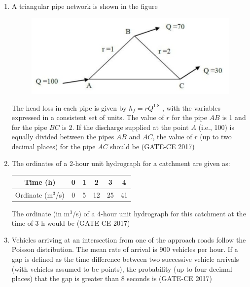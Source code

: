 \documentclass[journal,12pt,onecolumn]{article}
\theoremstyle{remark}
\begin{document}
\begin{enumerate}
    \item A triangular pipe network is shown in the figure 
    \begin{figure}[H]
    \centering
    \includegraphics[width=0.7\columnwidth]{figs/imageq23.jpg}  
    \caption{}
    \label{fig:23}
    \end{figure}
    The head loss in each pipe is given by $h_f = rQ^{1.8}$ , with the variables expressed in a consistent set of units. The value of $r$ for the pipe $AB$ is 1 and for the pipe $BC$ is 2. If the discharge supplied at the point $ A $ (i.e., 100) is equally divided between the pipes $AB$ and $AC$, the value of $r$ (up to two decimal places) for the pipe $AC$ should be \underline{\hspace{3cm}}\hfill (GATE-CE 2017)

    \item The ordinates of a 2-hour unit hydrograph for a catchment are given as:
    \begin{table}[H]
    \centering
    \begin{tabular}{|c|c|c|c|c|c|}
    \hline
    Time (h) & 0 & 1 & 2 & 3 & 4 \\
    \hline
    Ordinate (m$^3$/s) & 0 & 5 & 12 & 25 & 41 \\
    \hline
    \end{tabular}
    \end{table}
    The ordinate (in m$^3$/s) of a 4-hour unit hydrograph for this catchment at the time of 3 h would be \underline{\hspace{3cm}}\hfill (GATE-CE 2017)

    \item Vehicles arriving at an intersection from one of the approach roads follow the Poisson distribution. The mean rate of arrival is 900 vehicles per hour. If a gap is defined as the time difference between two successive vehicle arrivals (with vehicles assumed to be points), the probability (up to four decimal places) that the gap is greater than 8 seconds is \underline{\hspace{3cm}}\hfill (GATE-CE 2017)


\end{enumerate}
\end{document}
